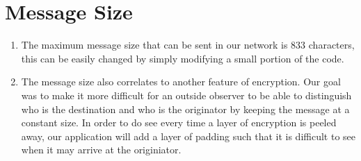 \documentclass[10pt]{report}
\begin{document}
\section{Message Size}
    \begin{enumerate}
		\item The maximum message size that can be sent in our network is 833 characters, this can
			be easily changed by simply modifying a small portion of the code.
		\item The message size also correlates to another feature of encryption. Our goal was to
			make it more difficult for an outside observer to be able to distinguish who is the
			destination and who is the originator by keeping the message at a constant size. In
			order to do see every time a layer of encryption is peeled away, our application will
			add a layer of padding such that it is difficult to see when it may arrive at the
			originiator.
    \end{enumerate}
\end{document}
